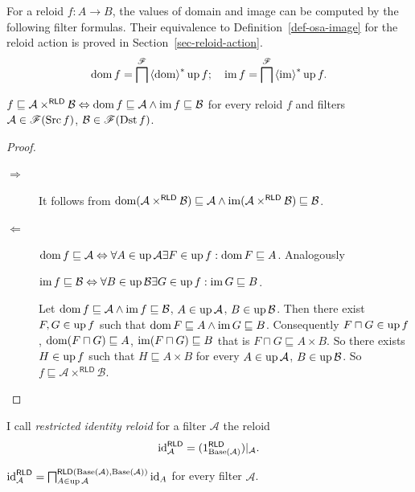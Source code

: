\begin{defn}
For a reloid $f:A\to B$,
the values of domain and image can be computed by the following
filter formulas. Their equivalence to Definition~\ref{def-osa-image}
for the reloid action is proved in Section~\ref{sec-reloid-action}.
\[
\operatorname{dom} f=\bigsqcap^{\mathscr{F}}\left\langle \operatorname{dom}\right\rangle ^{\ast}\operatorname{up} f;\quad\operatorname{im} f=\bigsqcap^{\mathscr{F}}\left\langle \operatorname{im}\right\rangle ^{\ast}\operatorname{up} f.
\]
\end{defn}
\begin{prop}\label{prop-rld-rectangle-bound}
$f\sqsubseteq\mathcal{A}\times^{\mathsf{RLD}}\mathcal{B}\Leftrightarrow\operatorname{dom} f\sqsubseteq\mathcal{A}\land\operatorname{im} f\sqsubseteq\mathcal{B}$
for every reloid $f$ and filters $\mathcal{A}\in\mathscr{F}(\operatorname{Src} f)$,
$\mathcal{B}\in\mathscr{F}(\operatorname{Dst} f)$.\end{prop}
\begin{proof}
~
\begin{description}
\item [{$\Rightarrow$}] It follows from $\operatorname{dom}(\mathcal{A}\times^{\mathsf{RLD}}\mathcal{B})\sqsubseteq\mathcal{A}\land\operatorname{im}(\mathcal{A}\times^{\mathsf{RLD}}\mathcal{B})\sqsubseteq\mathcal{B}$.
\item [{$\Leftarrow$}] $\operatorname{dom} f\sqsubseteq\mathcal{A}\Leftrightarrow\forall A\in\operatorname{up}\mathcal{A}\exists F\in\operatorname{up} f:\operatorname{dom} F\sqsubseteq A$.
Analogously


$\operatorname{im} f\sqsubseteq\mathcal{B}\Leftrightarrow\forall B\in\operatorname{up}\mathcal{B}\exists G\in\operatorname{up} f:\operatorname{im} G\sqsubseteq B$.


Let $\operatorname{dom} f\sqsubseteq\mathcal{A}\land\operatorname{im} f\sqsubseteq\mathcal{B}$,
$A\in\operatorname{up}\mathcal{A}$, $B\in\operatorname{up}\mathcal{B}$. Then there exist $F,G\in\operatorname{up} f$
such that $\operatorname{dom} F\sqsubseteq A\land\operatorname{im} G\sqsubseteq B$. Consequently
$F\sqcap G\in\operatorname{up} f$, $\operatorname{dom}(F\sqcap G)\sqsubseteq A$, $\operatorname{im}(F\sqcap G)\sqsubseteq B$
that is $F\sqcap G\sqsubseteq A\times B$. So there exists $H\in\operatorname{up} f$
such that $H\sqsubseteq A\times B$ for every $A\in\operatorname{up}\mathcal{A}$,
$B\in\operatorname{up}\mathcal{B}$. So $f\sqsubseteq\mathcal{A}\times^{\mathsf{RLD}}\mathcal{B}$.

\end{description}
\end{proof}
\begin{defn}
I call \emph{restricted identity
reloid} for a filter $\mathcal{A}$ the reloid
\[
{\operatorname{id}}_{\mathcal{A}}^{\mathsf{RLD}}=(1_{\operatorname{Base}(\mathcal{A})}^{\mathsf{RLD}})|_{\mathcal{A}}.
\]
\end{defn}
\begin{thm}
${\operatorname{id}}_{\mathcal{A}}^{\mathsf{RLD}}=\bigsqcap_{A\in\operatorname{up}\mathcal{A}}^{\mathsf{RLD}(\operatorname{Base}(\mathcal{A}),\operatorname{Base}(\mathcal{A}))}{\operatorname{id}}_{A}$
for every filter $\mathcal{A}$.\end{thm}
